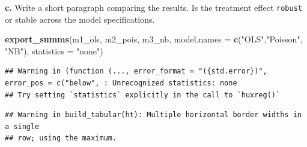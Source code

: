 \documentclass[
]{article}
\newenvironment{Shaded}{\begin{snugshade}}{\end{snugshade}}
\newcommand{\AttributeTok}[1]{\textcolor[rgb]{0.13,0.29,0.53}{#1}}
\newcommand{\FunctionTok}[1]{\textcolor[rgb]{0.13,0.29,0.53}{\textbf{#1}}}
\newcommand{\NormalTok}[1]{#1}
\newcommand{\StringTok}[1]{\textcolor[rgb]{0.31,0.60,0.02}{#1}}
\begin{document}
\textbf{c.} Write a short paragraph comparing the results. Is the
treatment effect \texttt{robust} or stable across the model
specifications.

\begin{Shaded}
\begin{Highlighting}[]
\FunctionTok{export\_summs}\NormalTok{(m1\_ols, m2\_pois, m3\_nb,}
             \AttributeTok{model.names =} \FunctionTok{c}\NormalTok{(}\StringTok{"OLS"}\NormalTok{,}\StringTok{"Poisson"}\NormalTok{, }\StringTok{"NB"}\NormalTok{),}
             \AttributeTok{statistics =} \StringTok{"none"}\NormalTok{)}
\end{Highlighting}
\end{Shaded}

\begin{verbatim}
## Warning in (function (..., error_format = "({std.error})", error_pos = c("below", : Unrecognized statistics: none
## Try setting `statistics` explicitly in the call to `huxreg()`
\end{verbatim}

\begin{verbatim}
## Warning in build_tabular(ht): Multiple horizontal border widths in a single
## row; using the maximum.
\end{verbatim}

 
  \providecommand{\huxb}[2]{\arrayrulecolor[RGB]{#1}\global\arrayrulewidth=#2pt}
  \providecommand{\huxvb}[2]{\color[RGB]{#1}\vrule width #2pt}
  \providecommand{\huxtpad}[1]{\rule{0pt}{#1}}
  \providecommand{\huxbpad}[1]{\rule[-#1]{0pt}{#1}}
\end{document}
